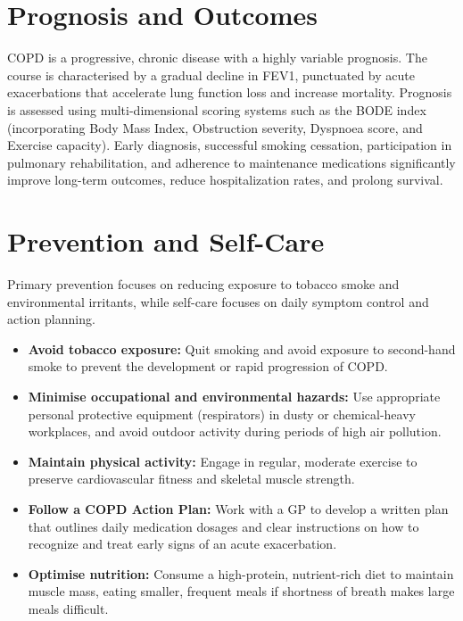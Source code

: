 \section*{Prognosis and Outcomes}
COPD is a progressive, chronic disease with a highly variable prognosis. The course is characterised by a gradual decline in FEV1, punctuated by acute exacerbations that accelerate lung function loss and increase mortality. Prognosis is assessed using multi-dimensional scoring systems such as the BODE index (incorporating Body Mass Index, Obstruction severity, Dyspnoea score, and Exercise capacity). Early diagnosis, successful smoking cessation, participation in pulmonary rehabilitation, and adherence to maintenance medications significantly improve long-term outcomes, reduce hospitalization rates, and prolong survival.

\section*{Prevention and Self-Care}
Primary prevention focuses on reducing exposure to tobacco smoke and environmental irritants, while self-care focuses on daily symptom control and action planning.
\begin{itemize}
    \item \textbf{Avoid tobacco exposure:} Quit smoking and avoid exposure to second-hand smoke to prevent the development or rapid progression of COPD.
    \item \textbf{Minimise occupational and environmental hazards:} Use appropriate personal protective equipment (respirators) in dusty or chemical-heavy workplaces, and avoid outdoor activity during periods of high air pollution.
    \item \textbf{Maintain physical activity:} Engage in regular, moderate exercise to preserve cardiovascular fitness and skeletal muscle strength.
    \item \textbf{Follow a COPD Action Plan:} Work with a GP to develop a written plan that outlines daily medication dosages and clear instructions on how to recognize and treat early signs of an acute exacerbation.
    \item \textbf{Optimise nutrition:} Consume a high-protein, nutrient-rich diet to maintain muscle mass, eating smaller, frequent meals if shortness of breath makes large meals difficult.
\end{itemize}

